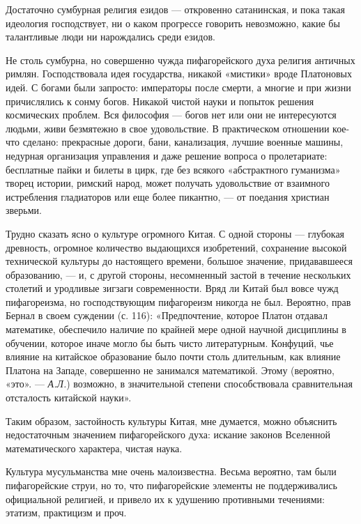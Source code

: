 Достаточно  сумбурная религия  езидов  ---  откровенно сатанинская,  и
пока  такая  идеология господствует,  ни  о  каком прогрессе  говорить
невозможно, какие бы талантливые люди ни нарождались среди езидов.

Не  столь сумбурна,  но совершенно  чужда пифагорейского  духа религия
античных  римлян. Господствовала  идея государства,  никакой «мистики»
вроде  Платоновых  идей.  С  богами были  запросто:  императоры  после
смерти,  а многие  и при  жизни  причислялись к  сонму богов.  Никакой
чистой науки и попыток решения  космических проблем. Вся философия ---
богов  нет или  они не  интересуются  людьми, живи  безмятежно в  свое
удовольствие.  В практическом  отношении  кое-что сделано:  прекрасные
дороги, бани, канализация, лучшие военные машины, недурная организация
управления и даже  решение вопроса о пролетариате:  бесплатные пайки и
билеты  в  цирк,  где  без  всякого  «абстрактного  гуманизма»  творец
истории,  римский  народ,  может получать  удовольствие  от  взаимного
истребления  гладиаторов  или  еще  более пикантно,  ---  от  поедания
христиан зверьми.

Трудно  сказать  ясно о  культуре  огромного  Китая. С  одной  стороны
---  глубокая древность,  огромное количество  выдающихся изобретений,
сохранение высокой технической культуры до настоящего времени, большое
значение,  придававшееся   образованию,  ---  и,  с   другой  стороны,
несомненный застой  в течение нескольких столетий  и уродливые зигзаги
современности.  Вряд   ли  Китай  был  вовсе   чужд  пифагореизма,  но
господствующим  пифагореизм  никогда  не был.  Вероятно,  прав  Бернал
в  своем  суждении (с.  116):  «Предпочтение,  которое Платон  отдавал
математике,  обеспечило   наличие  по   крайней  мере   одной  научной
дисциплины в обучении, которое иначе могло бы быть чисто литературным.
Конфуций,  чье  влияние  на  китайское образование  было  почти  столь
длительным,  как влияние  Платона на  Западе, совершенно  не занимался
математикой.  Этому (вероятно,  «это».  ---  \emph{А.Л.}) возможно,  в
значительной степени способствовала сравнительная отсталость китайской
науки».

Таким  образом,  застойность  культуры   Китая,  мне  думается,  можно
объяснить недостаточным значением пифагорейского духа: искание законов
Вселенной математического характера, чистая наука.

Культура  мусульманства  мне   очень  малоизвестна.  Весьма  вероятно,
там  были  пифагорейские  струи,  но то,  что  пифагорейские  элементы
не  поддерживались  официальной  религией,  и привело  их  к  удушению
противными течениями: этатизм, практицизм и проч.

